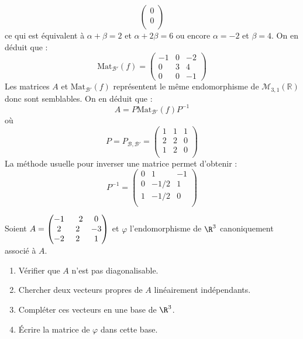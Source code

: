 \documentclass[a4paper,twoside,french,10pt]{VcCours}
\begin{document}
\begin{enumerate}
$$\begin{pmatrix}
0 \\
0 \\
\end{pmatrix}$$
ce qui est équivalent à $\alpha+ \beta =2$ et $\alpha+2 \beta =6$ ou encore $\alpha=-2$ et $\beta =4$. On en déduit que :
$$ \textrm{Mat}_{\mathcal{B}'}(f) = \begin{pmatrix}
-1 & 0 & -2 \\
0 & 3 & 4 \\
0 & 0 & -1
\end{pmatrix}$$
Les matrices $A$ et $\textrm{Mat}_{\mathcal{B}'}(f)$ représentent le même endomorphisme de $\mathcal{M}_{3,1}(\mathbb{R})$ donc sont semblables. On en déduit que :
$$ A = P \textrm{Mat}_{\mathcal{B}'}(f) P^{-1}$$
où 
$$P=P_{\mathcal{B}, \mathcal{B}'} = \begin{pmatrix}
1 & 1 & 1 \\
2 & 2 & 0 \\
1 & 2 & 0 \\
\end{pmatrix}$$
La méthode usuelle pour inverser une matrice permet d'obtenir :
$$ P^{-1} = \begin{pmatrix}
0 & 1 & -1 \\
0 & -1/2 & 1 \\
1 & -1/2 & 0 \\
\end{pmatrix}$$

\end{enumerate}

\begin{Exercice}{} Soient $A = \begin{pmatrix} -1 &\phantom-2 & 0 \cr 2 &2 &-3 \cr -2 &2 &1 \cr \end{pmatrix}$ et $\varphi$ l'endomorphisme de $\R^3$ canoniquement associé à $A$.

\begin{enumerate}
  \item Vérifier que $A$ n'est pas diagonalisable.
    
  \item Chercher deux vecteurs propres de $A$ linéairement indépendants.
    
  \item Compléter ces vecteurs en une base de $\R^3$.
    
  \item Écrire la matrice de $\varphi$ dans cette base.
        
\end{enumerate}
\end{Exercice} 
\end{document}
